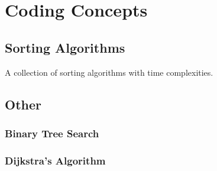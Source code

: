 \chapter{Coding Concepts}
\label{coding}

\section{Sorting Algorithms}
\label{coding:sorts}

\begin{table}[H]
\centering
\begingroup
\renewcommand*{\arraystretch}{1}

\endgroup
\caption{
A collection of sorting algorithms with time complexities.
}
\label{tab:sorting_table}
\end{table}


\section{Other}
\label{coding:other}

\subsection{Binary Tree Search}
\label{coding:other:binary_tree_search}



\subsection{Dijkstra's Algorithm}
\label{coding:other:dijkstra}
